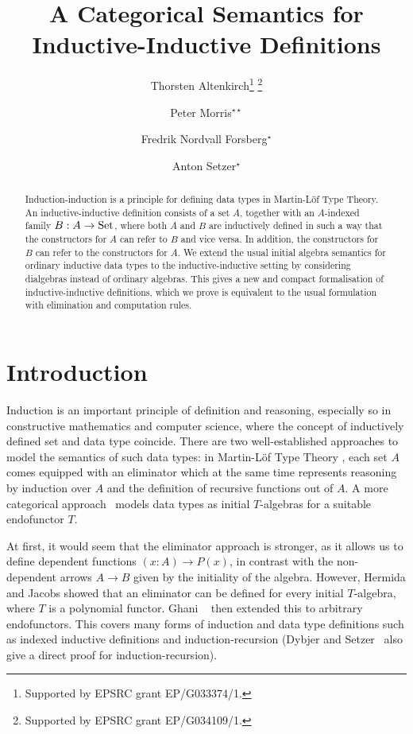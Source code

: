 \documentclass[orivec,envcountsame, ,envcountsect]{llncs}
\title{A Categorical Semantics for Inductive-Inductive Definitions}
\author{Thorsten Altenkirch\inst{1}\thanks{Supported by EPSRC grant EP/G033374/1.}\fnmsep
                                   \thanks{Supported by EPSRC grant EP/G034109/1.}
\and Peter Morris\inst{1}$^{\star\star}$
\and Fredrik Nordvall Forsberg\inst{2}$^{\star}$
\and Anton Setzer\inst{2}$^{\star}$}
\institute{School of Computer Science, University of Nottingham, UK
      \and Department of Computer Science, Swansea University, UK}
\begin{document}
\maketitle

\begin{abstract}
  Induction-induction is a principle for defining data types in
  Martin-L\"of Type Theory. An inductive-inductive definition consists
  of a set $A$, together with an $A$-indexed family $B : A \to \text{Set}$,
  where both $A$ and $B$ are inductively defined in such a way that
  the constructors for $A$ can refer to $B$ and vice versa. In
  addition, the constructors for $B$ can refer to the constructors for
  $A$.
%
  We extend the usual initial algebra semantics for ordinary
  inductive data types to the inductive-inductive setting by
  considering dialgebras instead of ordinary algebras. This gives a
  new and compact formalisation of inductive-inductive definitions,
  which we prove is equivalent to the usual formulation with
  elimination and computation rules.
\end{abstract}

\section{Introduction}

Induction is an important principle of definition and reasoning,
especially so in constructive mathematics and computer science, where
the concept of inductively defined set and data type coincide. There
are two well-established approaches to model the semantics of such
data types: in Martin-L\"of Type Theory
\cite{martinlof1984bibliopolis}, each set $A$ comes equipped with an
eliminator which at the same time represents reasoning by induction
over $A$ and the definition of recursive functions out of $A$.  A more
categorical
approach~\cite{goguenThatcherWagnerWright1977initialAlgebra} models
data types as initial $T$-algebras for a suitable endofunctor $T$.

At first, it would seem that the eliminator approach is stronger, as
it allows us to define dependent functions $(x : A) \to P(x)$, in
contrast with the non-dependent arrows $A \to B$ given by the
initiality of the algebra. However, Hermida and Jacobs
\cite{hermidaJacobs1998initInduction} showed that an eliminator can be
defined for every initial $T$-algebra, where $T$ is a polynomial
functor.  Ghani \etal\ \cite{ghaniJohannFumex2010fibind} then extended
this to arbitrary endofunctors.  This covers many forms of induction
and data type definitions such as indexed inductive definitions
\cite{dybjer1994indfam} and induction-recursion
\cite{dybjersetzer1999finax} (Dybjer and
Setzer~\cite{dybjersetzer2003inalg} also give a direct proof for
induction-recursion).
\end{document}
